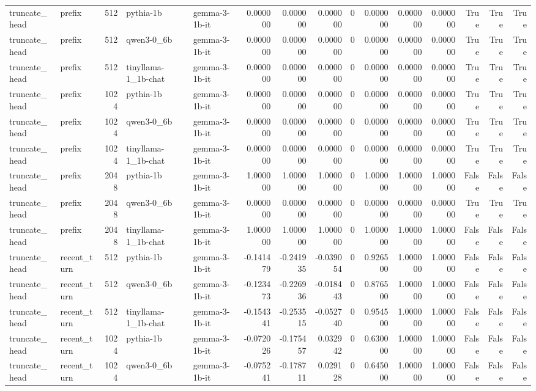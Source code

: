 \begin{tabular}{llrllrrrrrrrrrr}
truncate_head & prefix & 512 & pythia-1b & gemma-3-1b-it & 0.000000 & 0.000000 & 0.000000 & 0 & 0.000000 & 0.000000 & 0.000000 & True & True & True \\
truncate_head & prefix & 512 & qwen3-0_6b & gemma-3-1b-it & 0.000000 & 0.000000 & 0.000000 & 0 & 0.000000 & 0.000000 & 0.000000 & True & True & True \\
truncate_head & prefix & 512 & tinyllama-1_1b-chat & gemma-3-1b-it & 0.000000 & 0.000000 & 0.000000 & 0 & 0.000000 & 0.000000 & 0.000000 & True & True & True \\
truncate_head & prefix & 1024 & pythia-1b & gemma-3-1b-it & 0.000000 & 0.000000 & 0.000000 & 0 & 0.000000 & 0.000000 & 0.000000 & True & True & True \\
truncate_head & prefix & 1024 & qwen3-0_6b & gemma-3-1b-it & 0.000000 & 0.000000 & 0.000000 & 0 & 0.000000 & 0.000000 & 0.000000 & True & True & True \\
truncate_head & prefix & 1024 & tinyllama-1_1b-chat & gemma-3-1b-it & 0.000000 & 0.000000 & 0.000000 & 0 & 0.000000 & 0.000000 & 0.000000 & True & True & True \\
truncate_head & prefix & 2048 & pythia-1b & gemma-3-1b-it & 1.000000 & 1.000000 & 1.000000 & 0 & 1.000000 & 1.000000 & 1.000000 & False & False & False \\
truncate_head & prefix & 2048 & qwen3-0_6b & gemma-3-1b-it & 0.000000 & 0.000000 & 0.000000 & 0 & 0.000000 & 0.000000 & 0.000000 & True & True & True \\
truncate_head & prefix & 2048 & tinyllama-1_1b-chat & gemma-3-1b-it & 1.000000 & 1.000000 & 1.000000 & 0 & 1.000000 & 1.000000 & 1.000000 & False & False & False \\
truncate_head & recent_turn & 512 & pythia-1b & gemma-3-1b-it & -0.141479 & -0.241935 & -0.039054 & 0 & 0.926500 & 1.000000 & 1.000000 & False & False & False \\
truncate_head & recent_turn & 512 & qwen3-0_6b & gemma-3-1b-it & -0.123473 & -0.226936 & -0.018443 & 0 & 0.876500 & 1.000000 & 1.000000 & False & False & False \\
truncate_head & recent_turn & 512 & tinyllama-1_1b-chat & gemma-3-1b-it & -0.154341 & -0.253515 & -0.052740 & 0 & 0.954500 & 1.000000 & 1.000000 & False & False & False \\
truncate_head & recent_turn & 1024 & pythia-1b & gemma-3-1b-it & -0.072026 & -0.175457 & 0.032942 & 0 & 0.630000 & 1.000000 & 1.000000 & False & False & False \\
truncate_head & recent_turn & 1024 & qwen3-0_6b & gemma-3-1b-it & -0.075241 & -0.178711 & 0.029128 & 0 & 0.645000 & 1.000000 & 1.000000 & False & False & False \\

\end{tabular}
